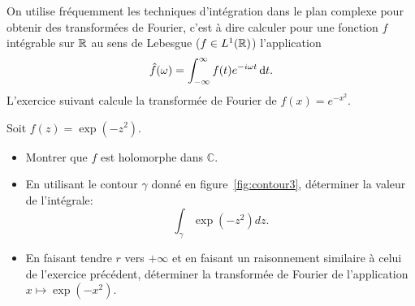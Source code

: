 On utilise fréquemment les techniques d'intégration dans le plan complexe pour
obtenir des transformées de Fourier, c'est à dire calculer pour une fonction $f$ intégrable sur $\mathbb R$ au sens de Lebesgue ($f \in L^1(\mathbb R)$) l'application 
\[\hat{f}(\omega)= \int_{-\infty}^\infty f(t) e^{- i \omega t} \mathop{}\mathopen{}\mathrm{d} t. \]
L'exercice suivant calcule la transformée de Fourier de $f(x) = e^{-x^2}$. 
\begin{exercice}\label{exerGauss} 
Soit $f(z)=\exp(-z^2)$.
\begin{itemize}
  \item Montrer que $f$ est holomorphe dans $\mathbb{C}$.
  \item En utilisant le contour $\gamma$ donné en figure~\ref{fig:contour3}, déterminer la valeur de l'intégrale:
  \[\int_{\gamma} \exp(-z^2)dz.\]
  \item En faisant tendre $r$ vers $+\infty$ et en faisant un raisonnement
  similaire à celui de l'exercice précédent, déterminer la transformée de
  Fourier de l'application $x \mapsto \exp(-x^2)$.
\end{itemize}

\begin{figure}[H]
\begin{center}
\shorthandoff{!}\shorthandoff{:}
\end{center}
\end{figure}
\end{exercice}

